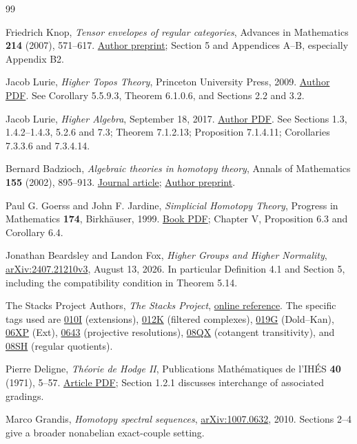 \documentclass[11pt]{article}
\theoremstyle{definition}
\theoremstyle{remark}\newtheorem{remark}[theorem]{Remark}
\begin{document}
\begin{thebibliography}{99}
Friedrich Knop, \emph{Tensor envelopes of regular categories},
Advances in Mathematics \textbf{214} (2007), 571--617.
\href{https://arxiv.org/pdf/math/0610552}{Author preprint};
Section 5 and Appendices A--B, especially Appendix B2.

Jacob Lurie, \emph{Higher Topos Theory}, Princeton University Press, 2009.
\href{https://www.math.ias.edu/~lurie/papers/HTT.pdf}{Author PDF}.
See Corollary 5.5.9.3, Theorem 6.1.0.6, and Sections 2.2 and 3.2.

Jacob Lurie, \emph{Higher Algebra}, September 18, 2017.
\href{https://www.math.ias.edu/~lurie/papers/HA.pdf}{Author PDF}.
See Sections 1.3, 1.4.2--1.4.3, 5.2.6 and 7.3;
Theorem 7.1.2.13; Proposition 7.1.4.11;
Corollaries 7.3.3.6 and 7.3.4.14.

Bernard Badzioch, \emph{Algebraic theories in homotopy theory},
Annals of Mathematics \textbf{155} (2002), 895--913.
\href{https://annals.math.princeton.edu/2002/155-3/p06}{Journal article};
\href{https://arxiv.org/abs/math/0110101}{Author preprint}.

Paul G. Goerss and John F. Jardine, \emph{Simplicial Homotopy Theory},
Progress in Mathematics \textbf{174}, Birkh\"auser, 1999.
\href{https://www.sas.rochester.edu/mth/sites/doug-ravenel/otherpapers/Goerss-Jardine2.pdf}{Book PDF};
Chapter V, Proposition 6.3 and Corollary 6.4.

Jonathan Beardsley and Landon Fox, \emph{Higher Groups and Higher Normality},
\href{https://arxiv.org/html/2407.21210v3}{arXiv:2407.21210v3},
August 13, 2026. In particular Definition 4.1 and Section 5,
including the compatibility condition in Theorem 5.14.

The Stacks Project Authors, \emph{The Stacks Project},
\href{https://stacks.math.columbia.edu/}{online reference}.
The specific tags used are
\href{https://stacks.math.columbia.edu/tag/010I}{010I} (extensions),
\href{https://stacks.math.columbia.edu/tag/012K}{012K} (filtered complexes),
\href{https://stacks.math.columbia.edu/tag/019G}{019G} (Dold--Kan),
\href{https://stacks.math.columbia.edu/tag/06XP}{06XP} (Ext),
\href{https://stacks.math.columbia.edu/tag/0643}{0643} (projective resolutions),
\href{https://stacks.math.columbia.edu/tag/08QX}{08QX} (cotangent transitivity),
and \href{https://stacks.math.columbia.edu/tag/08SH}{08SH} (regular quotients).

Pierre Deligne, \emph{Th\'eorie de Hodge II},
Publications Math\'ematiques de l'IH\'ES \textbf{40} (1971), 5--57.
\href{https://www.numdam.org/item/10.1007/BF02684692.pdf}{Article PDF};
Section 1.2.1 discusses interchange of associated gradings.

Marco Grandis, \emph{Homotopy spectral sequences},
\href{https://arxiv.org/pdf/1007.0632}{arXiv:1007.0632}, 2010.
Sections 2--4 give a broader nonabelian exact-couple setting.
\end{thebibliography}

\end{document}

